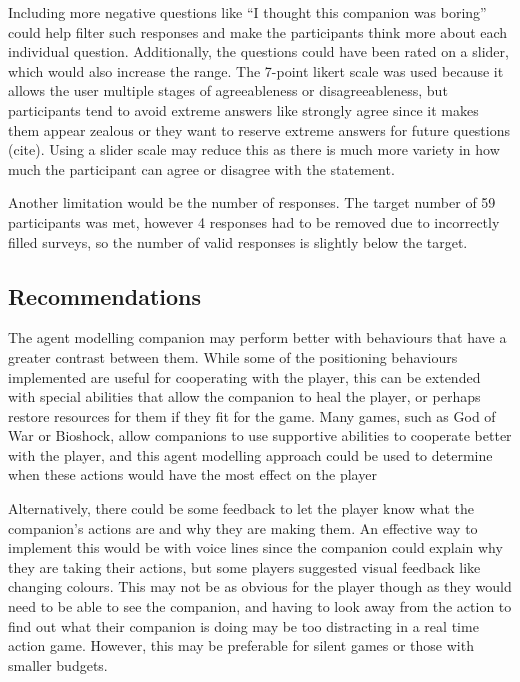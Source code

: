 \documentclass{IEEEtran}
\begin{document}

Including more negative questions like “I thought this companion was boring” could help filter such responses and make the participants think more about each individual question. Additionally, the questions could have been rated on a slider, which would also increase the range. The 7-point likert scale was used because it allows the user multiple stages of agreeableness or disagreeableness, but participants tend to avoid extreme answers like strongly agree since it makes them appear zealous or they want to reserve extreme answers for future questions (cite). Using a slider scale may reduce this as there is much more variety in how much the participant can agree or disagree with the statement.

Another limitation would be the number of responses. The target number of 59 participants was met, however 4 responses had to be removed due to incorrectly filled surveys, so the number of valid responses is slightly below the target.

\subsection{Recommendations}
\label{Recommendations}

The agent modelling companion may perform better with behaviours that have a greater contrast between them. While some of the positioning behaviours implemented are useful for cooperating with the player, this can be extended with special abilities that allow the companion to heal the player, or perhaps restore resources for them if they fit for the game. Many games, such as God of War or Bioshock, allow companions to use supportive abilities to cooperate better with the player, and this agent modelling approach could be used to determine when these actions would have the most effect on the player \cite{AIGamesBioshockAI, GDCAtreus}

Alternatively, there could be some feedback to let the player know what the companion’s actions are and why they are making them. An effective way to implement this would be with voice lines since the companion could explain why they are taking their actions, but some players suggested visual feedback like changing colours. This may not be as obvious for the player though as they would need to be able to see the companion, and having to look away from the action to find out what their companion is doing may be too distracting in a real time action game. However, this may be preferable for silent games or those with smaller budgets.
\end{document}

